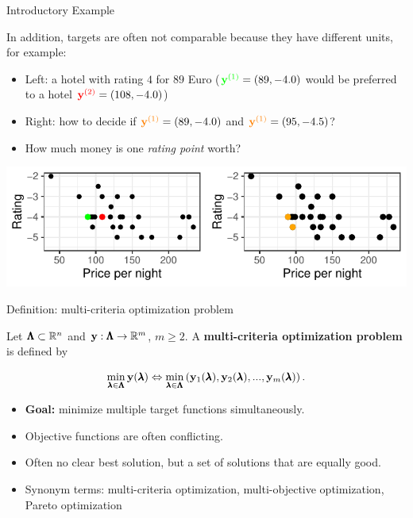 \begin{frame}[allowframebreaks]{Introductory Example}
\framebreak

In addition, targets are often not comparable because they have different units, for example:

\begin{itemize}
    \item Left: a hotel with rating $4$ for $89$ Euro ($\textcolor{green}{\mathbf{y}^{(1)}} = \left(89, - 4.0\right)$ would be preferred to a hotel $\textcolor{red}{\mathbf{y}^{(2)}} = \left(108, - 4.0\right)$)
\item Right: how to decide if $\textcolor{orange}{\mathbf{y}^{(1)}} = \left(89, - 4.0\right)$ and $\textcolor{orange}{\mathbf{y}^{(1)}} = \left(95, - 4.5\right)$?
\item How much money is one \textit{rating point} worth?
\end{itemize}

\centering \includegraphics[scale=1]{images/expedia-2-1}

\end{frame}


\begin{frame}{Definition: multi-criteria optimization problem}

Let $\pmb{\Lambda} \subset \mathbb{R}^n$ and $\mathbf{y}: \pmb{\Lambda} \to \mathbb{R}^m$, $m \ge 2$. A \textbf{multi-criteria optimization problem} is defined by

$$
\min_{\pmb{\lambda} \in \pmb{\Lambda}}  \mathbf{y}(\pmb{\lambda}) \Leftrightarrow \min_{\pmb{\lambda} \in \pmb{\Lambda}} \left(\mathbf{y}_1(\pmb{\lambda}), \mathbf{y}_2(\pmb{\lambda}), ..., \mathbf{y}_m(\pmb{\lambda})\right).
$$

\begin{itemize}
\item \textbf{Goal:} minimize multiple target functions simultaneously.
\item Objective functions are often conflicting.
\item Often no clear best solution, but a set of solutions that are equally good.
\item Synonym terms: multi-criteria optimization, multi-objective optimization, Pareto optimization
\end{itemize}

\end{frame}

